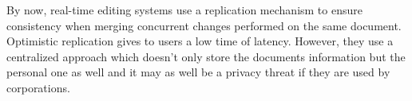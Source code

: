 By now, real-time editing systems use a replication mechanism to ensure consistency when merging concurrent changes performed on the same document. Optimistic replication gives to users a low time of latency. However, they use a centralized approach which doesn’t only store the documents information but the personal one as well and it may as well be a privacy threat if they are used by corporations. 